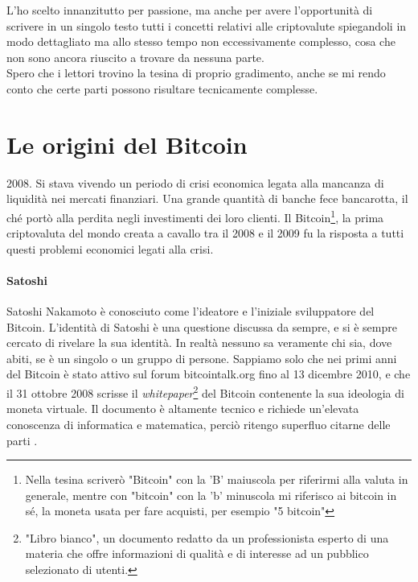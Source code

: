 \documentclass {article}
\begin{document}
\medskip
\noindent
%
L'ho scelto innanzitutto per passione, ma anche per avere l'opportunità di scrivere in un singolo testo tutti i concetti relativi alle criptovalute spiegandoli in modo dettagliato ma allo stesso tempo non eccessivamente complesso, cosa che non sono ancora riuscito a trovare da nessuna parte.\\

\medskip
\noindent
%
Spero che i lettori trovino la tesina di proprio gradimento, anche se mi rendo conto che certe parti possono risultare tecnicamente complesse.


\newpage
\null
\newpage


\tableofcontents


\newpage
\null
\newpage


\section {Le origini del Bitcoin}


2008. Si stava vivendo un periodo di crisi economica legata alla mancanza di liquidità nei mercati finanziari.
Una grande quantità di banche fece bancarotta, il ché portò alla perdita negli investimenti dei loro clienti.
Il Bitcoin\footnote{Nella tesina scriverò "Bitcoin" con la 'B' maiuscola per riferirmi alla valuta in generale, mentre con "bitcoin" con la 'b' minuscola mi riferisco ai bitcoin in sé, la moneta usata per fare acquisti, per esempio "5 bitcoin"}, la prima criptovaluta del mondo creata a cavallo tra il 2008 e il 2009 fu la risposta a tutti questi problemi economici legati alla crisi.

\paragraph {Satoshi}

Satoshi Nakamoto è conosciuto come l'ideatore e l'iniziale sviluppatore del Bitcoin.
L'identità di Satoshi è una questione discussa da sempre, e si è sempre cercato di rivelare la sua identità.
In realtà nessuno sa veramente chi sia, dove abiti, se è un singolo o un gruppo di persone. Sappiamo solo che nei primi anni del Bitcoin è stato attivo sul forum bitcointalk.org fino al 13 dicembre 2010, e che il 31 ottobre 2008 scrisse il \textit{whitepaper}\footnote{"Libro bianco", un documento redatto da un professionista esperto di una materia che offre informazioni di qualità e di interesse ad un pubblico selezionato di utenti.} del Bitcoin contenente la sua ideologia di moneta virtuale.
Il documento è altamente tecnico e richiede un'elevata conoscenza di informatica e matematica, perciò ritengo superfluo citarne delle parti \cite{whitepaper}.
\end{document}
